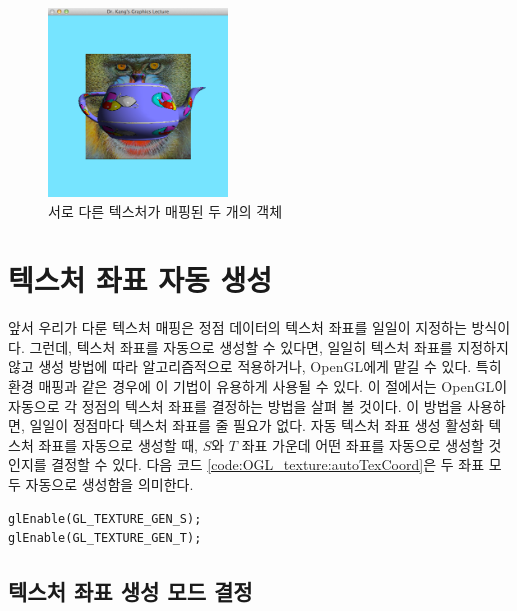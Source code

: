 \begin{figure}[h!]
  \centering
	\includegraphics[height=5cm]{OGL_texture/multipleTextures.png}
    \caption{서로 다른 텍스처가 매핑된 두 개의 객체}
    \label{fig:OGL_texture:multipleTextures}
\end{figure}

\section{텍스처 좌표 자동 생성}

앞서 우리가 다룬 텍스처 매핑은 정점 데이터의 텍스처 좌표를 일일이 지정하는 방식이다. 그런데, 텍스처 좌표를 자동으로 생성할 수 있다면, 일일히 텍스처 좌표를 지정하지 않고 생성 방법에 따라 알고리즘적으로 적용하거나, OpenGL에게 맡길 수 있다. 특히 환경 매핑과 같은 경우에 이 기법이 유용하게 사용될 수 있다.
이 절에서는 OpenGL이 자동으로 각 정점의 텍스처 좌표를 결정하는 방법을 살펴 볼 것이다. 이 방법을 사용하면, 일일이 정점마다 텍스처 좌표를 줄 필요가 없다.
자동 텍스처 좌표 생성 활성화
텍스처 좌표를 자동으로 생성할 때, $S$와 $T$ 좌표 가운데 어떤 좌표를 자동으로 생성할 것인지를 결정할 수 있다. 다음 코드 \ref{code:OGL_texture:autoTexCoord}은 
두 좌표 모두 자동으로 생성함을 의미한다.


\begin{algorithmbis}\label{code:OGL_texture:autoTexCoord}
\lstset{language=C++} 
\begin{lstlisting}
glEnable(GL_TEXTURE_GEN_S);
glEnable(GL_TEXTURE_GEN_T);
\end{lstlisting}
\end{algorithmbis}



\subsection{텍스처 좌표 생성 모드 결정}



